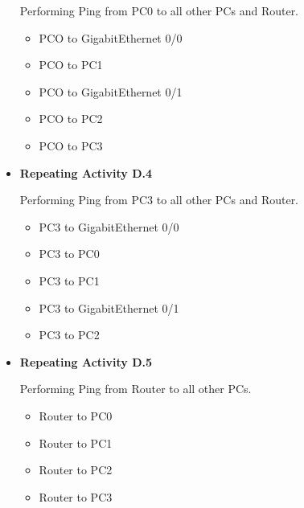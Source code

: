 \documentclass[a4paper,12pt]{article}
\begin{document}
\begin{itemize}
            Performing Ping from PC0 to all other PCs and Router.
            \begin{itemize}
                  \item PCO to GigabitEthernet 0/0
                  \item PCO to PC1
                  \item PCO to GigabitEthernet 0/1
                  \item PCO to PC2
                  \item PCO to PC3
            \end{itemize}

      \item \textbf{Repeating Activity D.4}

            Performing Ping from PC3 to all other PCs and Router.
            \begin{itemize}
                  \item PC3 to GigabitEthernet 0/0
                  \item PC3 to PC0
                  \item PC3 to PC1
                  \item PC3 to GigabitEthernet 0/1
                  \item PC3 to PC2
            \end{itemize}


      \item \textbf{Repeating Activity D.5}

            Performing Ping from Router to all other PCs.
            \begin{itemize}
                  \item Router to PC0
                  \item Router to PC1
                  \item Router to PC2
                  \item Router to PC3
            \end{itemize}
\end{itemize}
\end{document}
